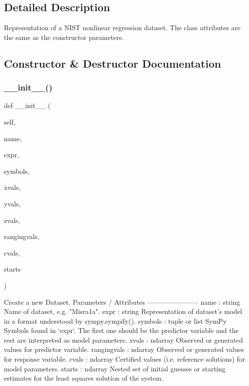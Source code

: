 \subsection{Detailed Description}
\begin{DoxyVerb}Representation of a NIST nonlinear regression dataset.
The class attributes are the same as the constructor parameters.
\end{DoxyVerb}
 

\subsection{Constructor \& Destructor Documentation}
\mbox{\label{class_gauss_newton_1_1_g_ndataset_a968de9ac0e395fe6cfdec7fb16a99b3d}} 
\subsubsection{\texorpdfstring{\+\_\+\+\_\+init\+\_\+\+\_\+()}{\_\_init\_\_()}}
{\footnotesize\ttfamily def \+\_\+\+\_\+init\+\_\+\+\_\+ (\begin{DoxyParamCaption}\item[{}]{self,  }\item[{}]{name,  }\item[{}]{expr,  }\item[{}]{symbols,  }\item[{}]{xvals,  }\item[{}]{yvals,  }\item[{}]{zvals,  }\item[{}]{rangingvals,  }\item[{}]{cvals,  }\item[{}]{starts }\end{DoxyParamCaption})}

\begin{DoxyVerb}Create a new Dataset.
Parameters / Attributes
-----------------------
name : string
    Name of dataset, e.g. "Misra1a".
expr : string
    Representation of dataset's model in a format understood by
    sympy.sympify().
symbols : tuple or list
    SymPy Symbols found in `expr`. The first one should be the predictor
    variable and the rest are interpreted as model parameters.
xvals : ndarray
    Observed or generated values for predictor variable.
rangingvals : ndarray
    Observed or generated values for response variable.
cvals : ndarray
    Certified values (i.e. reference solutions) for model parameters.
starts : ndarray
    Nested set of initial guesses or starting estimates for the least
    squares solution of the system.
\end{DoxyVerb}
 

